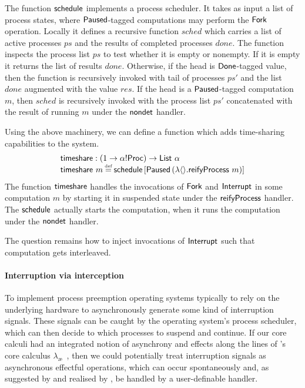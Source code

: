 \documentclass[12pt,phd,lfcs,twoside,openright,logo,leftchapter,normalheadings]{infthesis}
\theoremstyle{plain}
\theoremstyle{definition}
\begin{document}
%
The function $\mathsf{schedule}$ implements a process scheduler. It takes as
input a list of process states, where $\mathsf{Paused}$-tagged computations
may perform the $\mathsf{Fork}$ operation. Locally it defines a recursive
function $sched$ which carries a list of active processes $ps$ and the
results of completed processes $done$. The function inspects the
process list $ps$ to test whether it is empty or nonempty. If it is
empty it returns the list of results $done$. Otherwise, if the head is
$\mathsf{Done}$-tagged value, then the function is recursively invoked with
tail of processes $ps'$ and the list $done$ augmented with the value
$res$. If the head is a $\mathsf{Paused}$-tagged computation $m$, then
$sched$ is recursively invoked with the process list $ps'$
concatenated with the result of running $m$ under the $\mathsf{nondet}$
handler.

%
Using the above machinery, we can define a function which adds
time-sharing capabilities to the system.
%
\[
  \bl
     \timeshare : (\UnitType \to \alpha \eff \Proc) \to \List~\alpha\\
     \timeshare~m \defas \schedule\,[\Suspended\,(\lambda\Unit.\reifyP~m)]
  \el
\]
%
The function $\mathsf{timeshare}$ handles the invocations of $\mathsf{Fork}$ and
$\mathsf{Interrupt}$ in some computation $m$ by starting it in suspended state
under the $\mathsf{reifyProcess}$ handler. The $\mathsf{schedule}$ actually starts the
computation, when it runs the computation under the $\mathsf{nondet}$ handler.
%

The question remains how to inject invocations of $\mathsf{Interrupt}$ such
that computation gets interleaved.

\paragraph{Interruption via interception}
%
To implement process preemption operating systems typically to rely on
the underlying hardware to asynchronously generate some kind of
interruption signals. These signals can be caught by the operating
system's process scheduler, which can then decide to which processes
to suspend and continue.
%
If our core calculi had an integrated notion of asynchrony and effects
along the lines of \citeauthor{AhmanP21}'s core calculus
$\lambda_{\text{\ae}}$~\cite{AhmanP21}, then we could potentially
treat interruption signals as asynchronous effectful operations, which
can occur spontaneously and, as suggested by \citet{DolanEHMSW17} and
realised by \citet{Poulson20}, be handled by a user-definable handler.
%
\end{document}
